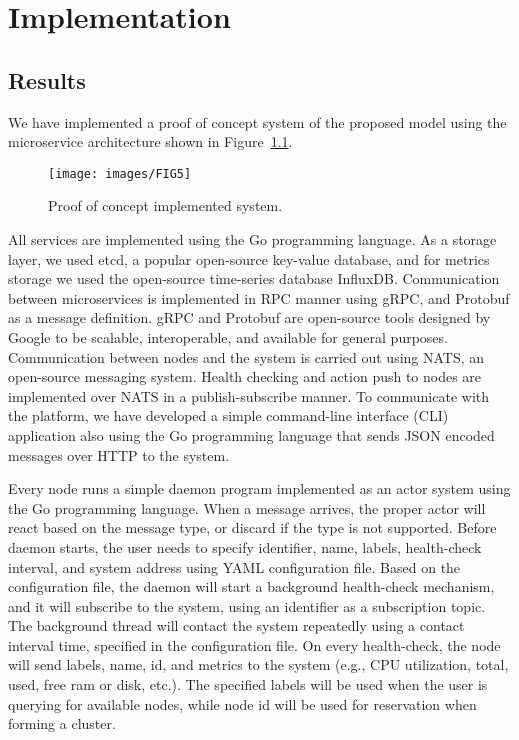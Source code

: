 \chapter{Implementation}\label{chapter:Implementation}
%
\section{Results}\label{sec:results}
%
We have implemented a proof of concept system of the proposed model using the microservice architecture shown in Figure~\ref{fig:fig11}.
\begin{figure}[!htbp]
	\begin{center}
		\texttt{[image: images/FIG5]}
	\end{center}
	\vspace{-0.9cm}
	\caption{Proof of concept implemented system.}
	\label{fig:fig11}
\end{figure} 

All services are implemented using the Go programming language. As a storage layer, we used etcd, a popular open-source key-value database, and for metrics storage we used the open-source time-series database InfluxDB. Communication between microservices is implemented in RPC manner using gRPC, and Protobuf as a message definition. gRPC and Protobuf are open-source tools designed by Google to be scalable, interoperable, and available for general purposes. Communication between nodes and the system is carried out using NATS, an open-source messaging system. Health checking and action push to nodes are implemented over NATS in a publish-subscribe manner. To communicate with the platform, we have developed a simple command-line interface (CLI) application also using the Go programming language that sends JSON encoded messages over HTTP to the system.

Every node runs a simple daemon program implemented as an actor system using the Go programming language. When a message arrives, the proper actor will react based on the message type, or discard if the type is not supported. Before daemon starts, the user needs to specify identifier, name, labels, health-check interval, and system address using YAML configuration file. Based on the configuration file, the daemon will start a background health-check mechanism, and it will subscribe to the system, using an identifier as a subscription topic. The background thread will contact the system repeatedly using a contact interval time, specified in the configuration file. On every health-check, the node will send labels, name, id, and metrics to the system (e.g., CPU utilization, total, used, free ram or disk, etc.). The specified labels will be used when the user is querying for available nodes, while node id will be used for reservation when forming a cluster.

